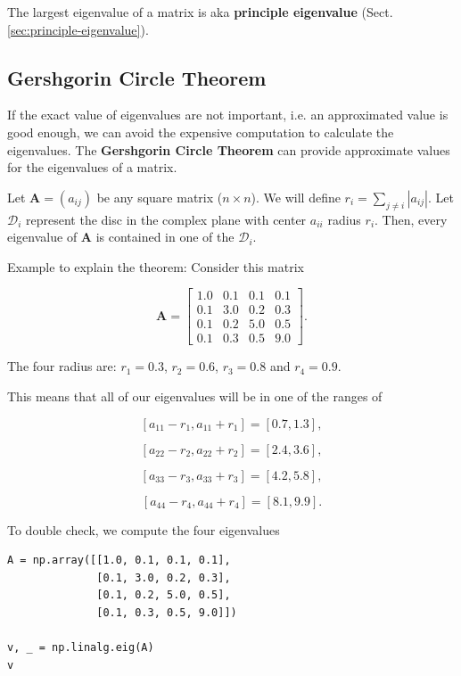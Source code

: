 The largest eigenvalue of a matrix is aka {\bf principle eigenvalue} (Sect.\ref{sec:principle-eigenvalue}).

\subsection{Gershgorin Circle Theorem}
\label{sec:Gershgorin-Circle-Theorem}

If the exact value of eigenvalues are not important, i.e. an approximated value
is good enough, we can avoid the expensive computation to calculate the
eigenvalues. The {\bf Gershgorin Circle Theorem} can provide approximate values for
the eigenvalues of a matrix.



Let $\mathbf{A} = (a_{ij})$ be any square matrix ($n\times n$).
We will define $r_i = \sum_{j \neq i} |a_{ij}|$.
Let $\mathcal{D}_i$ represent the disc in the complex plane 
with center $a_{ii}$ radius $r_i$.
Then, every eigenvalue of $\mathbf{A}$ is contained in one of the $\mathcal{D}_i$.


Example to explain the theorem: Consider this matrix

\begin{equation}
\mathbf{A} = \begin{bmatrix}
1.0 & 0.1 & 0.1 & 0.1 \\
0.1 & 3.0 & 0.2 & 0.3 \\
0.1 & 0.2 & 5.0 & 0.5 \\
0.1 & 0.3 & 0.5 & 9.0
\end{bmatrix}.
\end{equation}

The four radius are:  $r_1 = 0.3$, $r_2 = 0.6$, $r_3 = 0.8$ and $r_4 = 0.9$.

This means that all of our eigenvalues will be in one of the ranges of 

$$[a_{11}-r_1, a_{11}+r_1] = [0.7, 1.3], $$

$$[a_{22}-r_2, a_{22}+r_2] = [2.4, 3.6], $$

$$[a_{33}-r_3, a_{33}+r_3] = [4.2, 5.8], $$

$$[a_{44}-r_4, a_{44}+r_4] = [8.1, 9.9]. $$


To double check, we compute the four eigenvalues
\begin{lstlisting}
A = np.array([[1.0, 0.1, 0.1, 0.1],
              [0.1, 3.0, 0.2, 0.3],
              [0.1, 0.2, 5.0, 0.5],
              [0.1, 0.3, 0.5, 9.0]])

v, _ = np.linalg.eig(A) 
v
\end{lstlisting}

